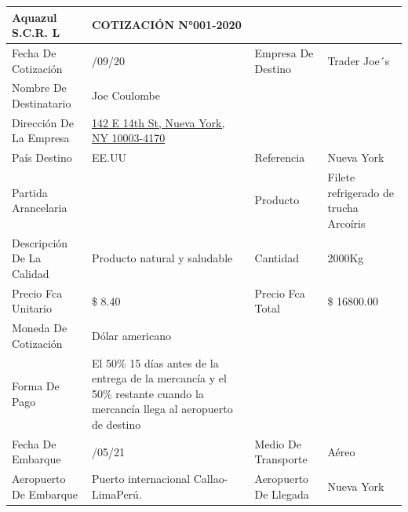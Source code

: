 \documentclass[
  stu,
  floatsintext,
  longtable,
  a4paper,
  nolmodern,
  notxfonts,
  notimes,
  colorlinks=true,linkcolor=blue,citecolor=blue,urlcolor=blue]{apa7}
\begin{document}
\begin{longtable}[]{@{}
  >{\raggedright\arraybackslash}p{}
  >{\raggedright\arraybackslash}p{}
  >{\raggedright\arraybackslash}p{}
  >{\raggedright\arraybackslash}p{}@{}}
\toprule\noalign{}
\begin{minipage}[b]{\linewidth}\raggedright
\textbf{Aquazul S.C.R. L}
\end{minipage} & \begin{minipage}[b]{\linewidth}\raggedright
COTIZACIÓN N°001-2020
\end{minipage} & \begin{minipage}[b]{\linewidth}\raggedright
\end{minipage} & \begin{minipage}[b]{\linewidth}\raggedright
\end{minipage} \\
\midrule\noalign{}
\endhead
\bottomrule\noalign{}
\endlastfoot
Fecha De Cotización & 21/09/20 & Empresa De Destino & Trader Joe´s \\
Nombre De Destinatario & Joe Coulombe & & \\
Dirección De La Empresa &
\href{https://www.tripadvisor.com.pe/Restaurant_Review-g60763-d1099366-Reviews-Trader_Joe-New_York_City_New_York.html\#MAPVIEW}{142
E 14th St, Nueva York, NY 10003-4170} & & \\
País Destino & EE.UU & Referencia & Nueva York \\
Partida Arancelaria & 304420000 & Producto & Filete refrigerado de
trucha Arcoíris \\
Descripción De La Calidad & Producto natural y saludable & Cantidad &
2000Kg \\
Precio Fca Unitario & \$ 8.40 & Precio Fca Total & \$ 16800.00 \\
Moneda De Cotización & Dólar americano & & \\
Forma De Pago & El 50\% 15 días antes de la entrega de la mercancía y el
50\% restante cuando la mercancía llega al aeropuerto de destino & & \\
Fecha De Embarque & 30/05/21 & Medio De Transporte & Aéreo \\
Aeropuerto De Embarque & Puerto internacional Callao-LimaPerú. &
Aeropuerto De Llegada & Nueva York \\
\end{longtable}
\end{document}
